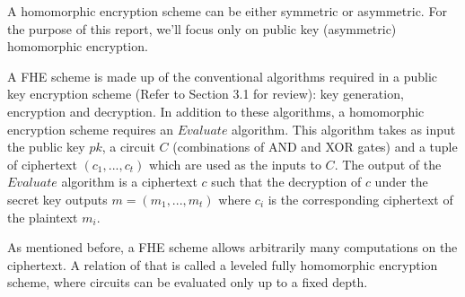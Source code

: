 \documentclass[../../main.tex]{subfiles}
\begin{document}
A homomorphic encryption scheme can be either symmetric or asymmetric. For the purpose of this report, we'll focus only on public key (asymmetric) homomorphic encryption.

A FHE scheme is made up of the conventional algorithms required in a public key encryption scheme (Refer to Section 3.1 for review): key generation, encryption and decryption. In addition to these algorithms, a homomorphic encryption scheme requires an $Evaluate$ algorithm. This algorithm takes as input the public key $pk$, a circuit $C$ (combinations of AND and XOR gates) and a tuple of ciphertext $(c_1,...,c_t)$ which are used as the inputs to $C$. The output of the $Evaluate$ algorithm is a ciphertext $c$ such that the decryption of $c$ under the secret key outputs $m = (m_1,...,m_t)$ where $c_i$ is the corresponding ciphertext of the plaintext $m_i$.

As mentioned before, a FHE scheme allows arbitrarily many computations on the ciphertext. A relation of that is called a leveled fully homomorphic encryption scheme, where circuits can be evaluated only up to a fixed depth. 
\end{document}

